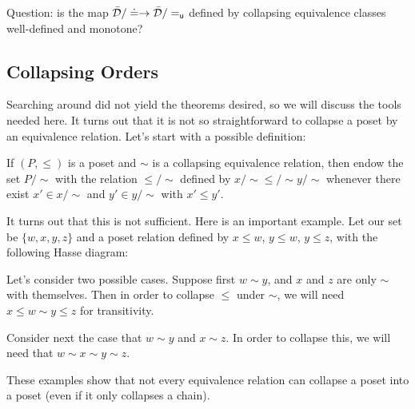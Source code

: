 \documentclass{article}
\begin{document}
Question: is the map $\bar{\mathcal{D}} / \doteq \to \bar{\mathcal{D}} / =_{\mathsf{u}}$ defined by collapsing equivalence classes well-defined and monotone? 


\subsection{Collapsing Orders}

Searching around did not yield the theorems desired, so we will discuss the tools needed here. It turns out that it is not so straightforward to collapse a poset by an equivalence relation. Let's start with a possible definition: 

If $(P,\leq)$ is a poset and $\sim$ is a collapsing equivalence relation, then endow the set $P/\sim$ with the relation $\leq/\sim$ defined by $x/\sim \leq/\sim y/\sim$ whenever there exist $x'\in x/\sim$ and $y'\in y/\sim$ with $x'\leq y'$. 

It turns out that this is not sufficient. Here is an important example. Let our set be $\{w,x,y,z\}$ and a poset relation defined by $x\leq w$, $y\leq w$, $y\leq z$, with the following Hasse diagram:


Let's consider two possible cases. Suppose first $w\sim y$, and $x$ and $z$ are only $\sim$ with themselves. Then in order to collapse $\leq$ under $\sim$, we will need $x \leq w\sim y \leq z$ for transitivity. 

Consider next the case that $w\sim y$ and $x\sim z$. In order to collapse this, we will need that $w\sim x\sim y \sim z$.

These examples show that not every equivalence relation can collapse a poset into a poset (even if it only collapses a chain). 
\end{document}
